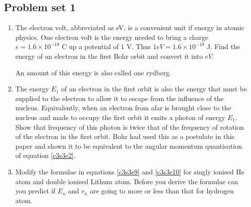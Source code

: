 \subsection{Problem set 1}
\begin{enumerate}
\item The electron volt, abbreviated as eV, is a convenient unit if energy in 
atomic physics. One electron volt is the energy needed to bring a charge $e =
1.6 \times 10^{-19}$ C up a potential of $1$ V. Thus $1 eV=1.6\times 10^{-19}$
J. Find the energy of an electron in the first Bohr orbit and convert it into
$eV$.

An amount of this energy is also called one rydberg.

\item The energy $E_1$ of an electron in the first orbit is also the energy that
must be supplied to the electron to allow it to escape from the influence of the
nucleus. Equivalently, when an electron from afar is brought close to the 
nucleus and made to occupy the first orbit it emits a photon of energy $E_1$. 
Show that frequency of this photon is twice that of the frequency of rotation of
the electron in the first orbit. Bohr had used this as a postulate in this paper
\cite{bohr1913constitution} and shown it to be equivalent to the angular 
momentum quantisation of equation \eqref{c3s3e2}.

\item Modify the formulae in equations \eqref{c3s3e9} and \eqref{c3s3e10} for
singly ionised He atom and double ionised Lithum atom. Before you derive the
formulae can you predict if $E_n$ and $r_n$ are going to more or less than that
for hydrogen atom.


\end{enumerate}
